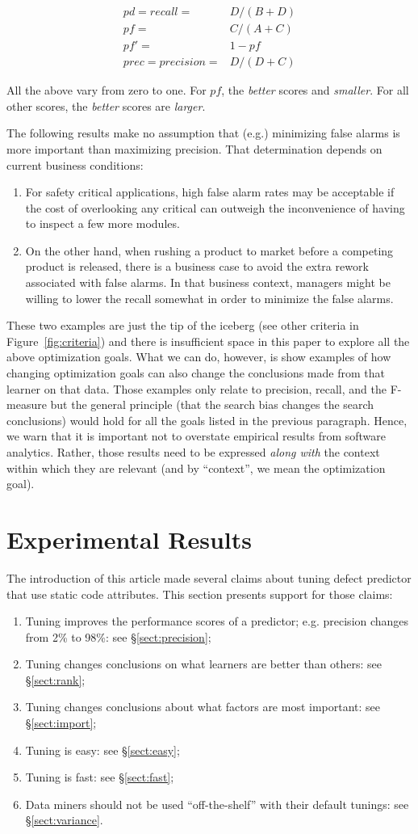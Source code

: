 \documentclass{sig-alternative}
\newcommand{\be}{\begin{enumerate}}
\newcommand{\ee}{\end{enumerate}}
\newcommand{\tion}[1]{\S\ref{sect:#1}}
\newcommand{\fig}[1]{Figure~\ref{fig:#1}}
\begin{document}
{\scriptsize\[
\begin{array}{ll}
pd=recall=&D/(B+D)\\
pf=&C/(A+C)\\
pf'=& 1 - pf\\
prec=precision=&D/(D+C) 
\end{array}
\]}

All the above vary from zero to one. For $pf$, the {\em better} scores and {\em smaller}.
For all other scores, the {\em better} scores are {\em larger}.

The following results make no assumption that (e.g.) minimizing false alarms is 
more important than maximizing   precision. That determination 
depends on current business conditions:
\be
\item
For safety critical applications, high false alarm rates may be acceptable if the cost
of overlooking any critical can outweigh the inconvenience of having to inspect a few more
modules. 
\item
On the other hand, when rushing a product to market before a competing product is released, there is a business case to 
avoid the extra rework associated with false alarms.  In that business context, 
managers might be willing to lower the recall somewhat in order to minimize the false alarms.
\ee
These two examples are just the tip of the iceberg (see other criteria in \fig{criteria})
and there is insufficient space in this paper to explore all the above optimization goals.
What we can do, however, is show examples of how  changing  optimization goals can also change 
the conclusions made from that learner on that data. Those examples only relate to precision, recall, and the F-measure
but the general principle (that the search bias changes the search conclusions) would hold for all the goals
listed in the previous paragraph.  Hence, we warn that it is important not to overstate  empirical results from software analytics.
Rather, those results need to be expressed {\em along with} the context within which they are
relevant (and by ``context'', we mean the optimization goal).


\section{Experimental Results}

The introduction of this article made several claims about tuning defect predictor
that use static code attributes. This section presents
support for those claims:
\be
\item  Tuning    improves the performance scores of a predictor;
e.g.  precision changes from 2\% to 98\%: see \tion{precision};
\item Tuning changes conclusions on what learners are better than others: see \tion{rank};
\item Tuning changes conclusions about what factors are most important: see \tion{import};
\item  Tuning is easy: see \tion{easy};
\item Tuning is fast: see \tion{fast};
\item Data miners should not be used ``off-the-shelf'' with their default tunings: see \tion{variance}.
\ee
\end{document}
